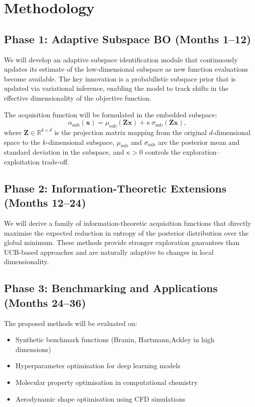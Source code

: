 \documentclass[
    language=english,
    doctype=thesis-proposal,
    institution=none,
]{../../omnilatex}
\begin{document}
\section{Methodology}

\subsection{Phase 1: Adaptive Subspace BO (Months 1--12)}
We will develop an adaptive subspace identification module that continuously
updates its estimate of the low-dimensional subspace as new function
evaluations become available.  The key innovation is a probabilistic subspace
prior that is updated via variational inference, enabling the model to track
shifts in the effective dimensionality of the objective function.

The acquisition function will be formulated in the embedded subspace:
\begin{equation}
    \alpha_{\text{sub}}(\mathbf{x}) = \mu_{\text{sub}}(\mathbf{Z}\mathbf{x})
    + \kappa \, \sigma_{\text{sub}}(\mathbf{Z}\mathbf{x}),
    \label{eq:ucb-sub}
\end{equation}
where $\mathbf{Z} \in \mathbb{R}^{k \times d}$ is the projection matrix
mapping from the original $d$-dimensional space to the $k$-dimensional subspace,
$\mu_{\text{sub}}$ and $\sigma_{\text{sub}}$ are the posterior mean and standard
deviation in the subspace, and $\kappa > 0$ controls the exploration--exploitation
trade-off.

\subsection{Phase 2: Information-Theoretic Extensions (Months 12--24)}
We will derive a family of information-theoretic acquisition functions
that directly maximise the expected reduction in entropy of the posterior
distribution over the global minimum.  These methods provide stronger
exploration guarantees than UCB-based approaches and are naturally adaptive to
changes in local dimensionality.

\subsection{Phase 3: Benchmarking and Applications (Months 24--36)}
The proposed methods will be evaluated on:
\begin{itemize}
    \item Synthetic benchmark functions (Branin, Hartmann,Ackley in high
    dimensions)
    \item Hyperparameter optimisation for deep learning models
    \item Molecular property optimisation in computational chemistry
    \item Aerodynamic shape optimisation using CFD simulations
\end{itemize}
\end{document}
